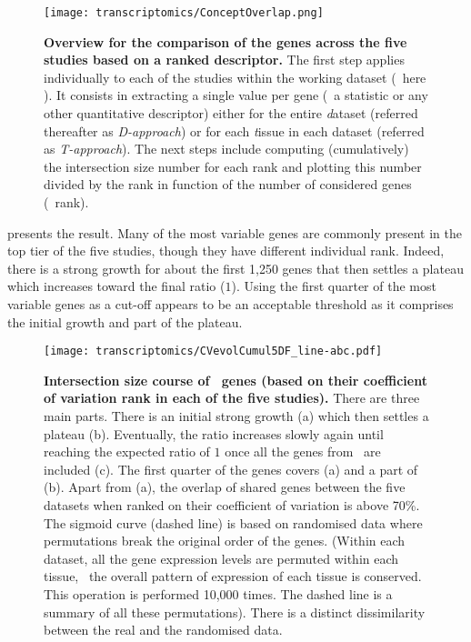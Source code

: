\begin{figure}[!htpb]
    \texttt{[image: transcriptomics/ConceptOverlap.png]}\centering
    \caption[Overview for the comparison of the genes across the five
    studies based on a ranked descriptor 5 studies]{\label{fig:overlapConcept}%
    \textbf{Overview for the comparison of the genes across the five
    studies based on a ranked descriptor.}
    The first step applies individually to each of the studies
    within the working dataset (\ie\ here \setOne).
    It consists in extracting a single value per gene
    (\eg\ a statistic or any other quantitative descriptor)
    either for the entire \emph{d}ataset (referred thereafter as \emph{D-approach}) or
    for each \emph{t}issue in each dataset (referred as \emph{T-approach}).
    The next steps include
    computing (cumulatively) the intersection size number for each rank
    and plotting this number divided by the rank
    in function of the number of considered genes (\ie\ rank).}
\end{figure}

 presents the result.
Many of the most variable genes are commonly present in the top tier of the
five studies, though they have different individual rank.
Indeed, there is a strong growth for about the first 1,250 genes that then
settles a plateau which increases toward the final ratio ($1$).
Using the first quarter of the most variable genes as a cut-off appears
to be an acceptable threshold
as it comprises the initial growth and part of the plateau.

\begin{figure}[!ht]
    \texttt{[image: transcriptomics/CVevolCumul5DF\_line-abc.pdf]}\centering
    \vspace{-0.15in}
    \caption[Intersection size of \setOne\ genes (ranked by cv)]%
    {\label{fig:cvEvol5DF}\textbf{Intersection size course
    of \setOne\ genes (based on their coefficient of variation rank
    in each of the five studies).}
    There are three main parts.
    There is an initial strong growth (a)
    which then settles a plateau (b).
    Eventually, the ratio increases slowly again
    until reaching the expected ratio of $1$ once all the genes from \setOne\
    are included (c).
    The first quarter of the genes covers (a) and a part of (b).
    Apart from (a),
    the overlap of shared genes between the five datasets when ranked on their
    coefficient of variation is above 70\%.
    The sigmoid curve (dashed line) is based on randomised data
    where permutations break the original order of the genes. (Within each dataset,
    all the gene expression levels are permuted within each tissue,
    \ie\ the overall pattern of expression of each tissue is conserved.
    This operation is performed 10,000 times.
    The dashed line is a summary of all these permutations).
    There is a distinct dissimilarity between the real and the randomised data.}
\end{figure}

